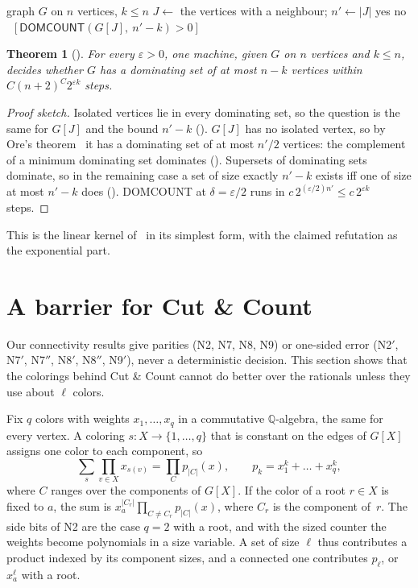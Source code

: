 \documentclass[11pt]{article}
\newtheorem{theorem}{Theorem}
\theoremstyle{remark}
\newcommand{\lean}[1]{\texttt{\detokenize{#1}}}
\newcommand{\DOMCOUNT}{\textsf{DOMCOUNT}}
\begin{document}
\begin{algorithm}[t]
\caption{Nonblocker (A3$'$). Lean: \lean{NbTM.preN}, \lean{NbTM.nbM}.}\label{alg:nb}
\begin{algorithmic}[1]
\Require graph $G$ on $n$ vertices, $k\le n$
\State $J\gets$ the vertices with a neighbour; $n'\gets|J|$
 \Return yes 
 \Return no
\Else\ \Return $[\DOMCOUNT(G[J],\ n'-k)>0]$ 
\EndIf
\end{algorithmic}
\end{algorithm}

\begin{theorem}[\lean{nb_fpt}]
For every $\varepsilon>0$, one machine, given $G$ on $n$ vertices and $k\le n$, decides whether $G$
has a dominating set of at most $n-k$ vertices within $C(n+2)^C2^{\varepsilon k}$ steps.
\end{theorem}

\begin{proof}[Proof sketch]
Isolated vertices lie in every dominating set, so the question is the same for $G[J]$ and the bound
$n'-k$ (\lean{nb_iff}). $G[J]$ has no isolated vertex, so by Ore's theorem~\cite{Ore62} it has a
dominating set of at most $n'/2$ vertices: the complement of a minimum dominating set dominates
(\lean{ore}). Supersets of dominating sets dominate, so in the remaining case a set of size exactly
$n'-k$ exists iff one of size at most $n'-k$ does (\lean{nb_answer}). \DOMCOUNT{} at $\delta=\varepsilon/2$
runs in $c\,2^{(\varepsilon/2)n'}\le c\,2^{\varepsilon k}$ steps.
\end{proof}

This is the linear kernel of~\cite{DFFPR06} in its simplest form, with the claimed refutation as the
exponential part.

\section{A barrier for Cut \& Count}\label{sec:barrier}

Our connectivity results give parities (N2, N7, N8, N9) or one-sided error (N2$'$, N7$'$, N7$''$,
N8$'$, N8$''$, N9$'$), never a deterministic decision. This section shows that the colorings behind
Cut \& Count cannot do better over the rationals unless they use about $\ell$ colors.

Fix $q$ colors with weights $x_1,\dots,x_q$ in a commutative $\mathbb Q$-algebra, the same for every
vertex. A coloring $s:X\to\{1,\dots,q\}$ that is constant on the edges of $G[X]$ assigns one color
to each component, so
\[
\sum_s\prod_{v\in X}x_{s(v)}=\prod_{C}p_{|C|}(x),\qquad p_k=x_1^k+\dots+x_q^k,
\]
where $C$ ranges over the components of $G[X]$. If the color of a root $r\in X$ is fixed to $a$, the
sum is $x_a^{|C_r|}\prod_{C\ne C_r}p_{|C|}(x)$, where $C_r$ is the component of~$r$. The side bits of
N2 are the case $q=2$ with a root, and with the sized counter the weights become polynomials in a
size variable. A set of size $\ell$ thus contributes a product indexed by its component sizes, and a
connected one contributes $p_\ell$, or $x_a^\ell$ with a root.
\end{document}
